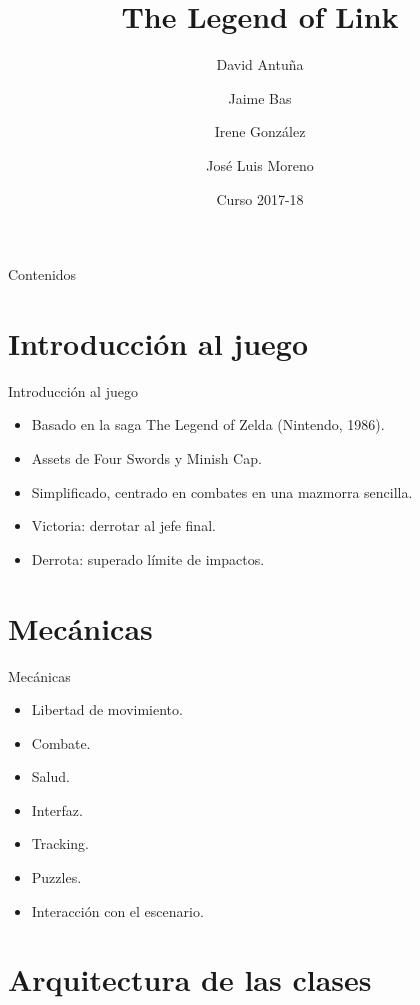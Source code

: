 \documentclass{beamer}
\title{The Legend of Link}
\author{David Antuña \and Jaime Bas \and Irene González \and José Luis Moreno}
\institute[UCM]
{
  DVI\\
  Universidad Complutense de Madrid
}
\date{Curso 2017-18}
\begin{document}
\begin{frame}
	\titlepage
\end{frame}

\begin{frame}{Contenidos}
	\begin{multicols}{2}
		\tableofcontents
	\end{multicols}
\end{frame}


\section{Introducción al juego}

\begin{frame}{Introducción al juego}
	\begin{itemize}
		\item Basado en la saga The Legend of Zelda (Nintendo, 1986).
		\item Assets de Four Swords y Minish Cap.
		\item Simplificado, centrado en combates en una mazmorra sencilla.
		\item Victoria: derrotar al jefe final.
		\item Derrota: superado límite de impactos.
	\end{itemize}
\end{frame}

\section{Mecánicas}

\begin{frame}{Mecánicas}
	\begin{itemize}
		\item Libertad de movimiento.
		\item Combate.
		\item Salud.
		\item Interfaz.
		\item Tracking.
		\item Puzzles.
		\item Interacción con el escenario.
	\end{itemize}
\end{frame}

\section{Arquitectura de las clases}
\end{document}
